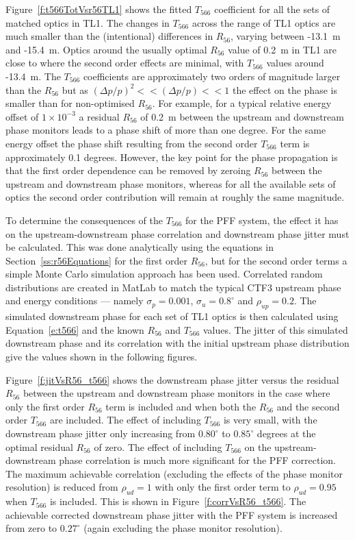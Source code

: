 Figure~\ref{f:t566TotVsr56TL1} shows the fitted \(T_{566}\) coefficient for all the sets of matched optics in TL1. The changes in \(T_{566}\) across the range of TL1 optics are much smaller than the (intentional) differences in \(R_{56}\), varying between -13.1~m and -15.4~m. Optics around the usually optimal \(R_{56}\) value of 0.2~m in TL1  are close to where the second order effects are minimal, with \(T_{566}\) values around -13.4~m. The \(T_{566}\) coefficients are approximately two orders of magnitude larger than the \(R_{56}\) but as \(\left(\Delta p / p\right)^2 << \left(\Delta p / p\right) << 1\) the effect on the phase is smaller than for non-optimised \(R_{56}\). For example, for a typical relative energy offset of \(1 \times 10^{-3}\) a residual \(R_{56}\) of 0.2~m between the upstream and downstream phase monitors leads to a phase shift of more than one degree. For the same energy offset the phase shift resulting from the second order \(T_{566}\) term is approximately 0.1 degrees. However, the key point for the phase propagation is that the first order dependence can be removed by zeroing \(R_{56}\) between the upstream and downstream phase monitors, whereas for all the available sets of optics the second order contribution will remain at roughly the same magnitude.


To determine the consequences of the \(T_{566}\) for the PFF system, the effect it has on the upstream-downstream phase correlation and downstream phase jitter must be calculated. This was done analytically using the equations in Section~\ref{ss:r56Equations} for the first order \(R_{56}\), but for the second order terms a simple Monte Carlo simulation approach has been used. Correlated random distributions are created in MatLab to match the typical CTF3 upstream phase and energy conditions --- namely \(\sigma_p = 0.001\), \(\sigma_u = 0.8^\circ\) and \(\rho_{up} = 0.2\). The simulated downstream phase for each set of TL1 optics is then calculated using Equation~\ref{e:t566} and the known \(R_{56}\) and \(T_{566}\) values. The jitter of this simulated downstream phase and its correlation with the initial upstream phase distribution give the values shown in the following figures.

Figure~\ref{f:jitVsR56_t566} shows the downstream phase jitter versus the residual \(R_{56}\) between the upstream and downstream phase monitors in the case where only the first order \(R_{56}\) term is included and when both the \(R_{56}\) and the second order \(T_{566}\) are included. The effect of including \(T_{566}\) is very small, with the downstream phase jitter only increasing from \(0.80^\circ\) to \(0.85^\circ\) degrees at the optimal residual \(R_{56}\) of zero. The effect of including \(T_{566}\) on the upstream-downstream phase correlation is much more significant for the PFF correction. The maximum achievable correlation (excluding the effects of the phase monitor resolution) is reduced from \(\rho_{ud} = 1\) with only the first order term to \(\rho_{ud} = 0.95\) when \(T_{566}\) is included. This is shown in Figure~\ref{f:corrVsR56_t566}.  The achievable corrected downstream phase jitter with the PFF system is increased from zero to \(0.27^\circ\) (again excluding the phase monitor resolution). 


